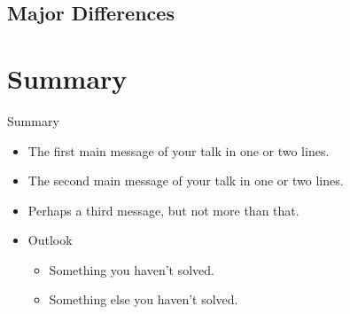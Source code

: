 \documentclass[aspectratio=169, fleqn]{beamer}
\begin{document}
\subsection{Major Differences}


\section*{Summary}

\begin{frame}{Summary}
  \begin{itemize}
  \item
    The \alert{first main message} of your talk in one or two lines.
  \item
    The \alert{second main message} of your talk in one or two lines.
  \item
    Perhaps a \alert{third message}, but not more than that.
  \end{itemize}
  
  \begin{itemize}
  \item
    Outlook
    \begin{itemize}
    \item
      Something you haven't solved.
    \item
      Something else you haven't solved.
    \end{itemize}
  \end{itemize}
\end{frame}



\appendix
\end{document}
